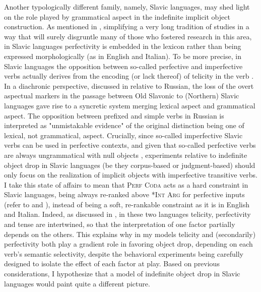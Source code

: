 Another typologically different family, namely, Slavic languages, may shed light on the role played by grammatical aspect in the indefinite implicit object construction. As mentioned in , simplifying a very long tradition of studies in a way that will surely disgruntle many of those who fostered research in this area, in Slavic languages perfectivity is embedded in the lexicon rather than being expressed morphologically (as in English and Italian). To be more precise, in Slavic languages the opposition between so-called perfective and imperfective verbs actually derives from the encoding (or lack thereof) of telicity in the verb \parencite{bertinetto2012diachronic, bertinetto-delfitto2000aspect, bertinetto2001frequent}. In a diachronic perspective, discussed in \textcite{bertinetto2012diachronic} relative to Russian, the loss of the overt aspectual markers in the passage between Old Slavonic to (Northern) Slavic languages gave rise to a syncretic system merging lexical aspect and grammatical aspect. The opposition between prefixed and simple verbs in Russian is interpreted as "unmistakable evidence" of the original distinction being one of lexical, not grammatical, aspect. Crucially, since so-called imperfective Slavic verbs can be used in perfective contexts, and given that so-called perfective verbs are always ungrammatical with null objects \parencite{sopata2016null, TsimpliPapadopoulou2006}, experiments relative to indefinite object drop in Slavic languages (be they corpus-based or judgment-based) should only focus on the realization of implicit objects with imperfective transitive verbs. I take this state of affairs to mean that \textsc{Perf Coda} acts as a hard constraint in Slavic languages, being always re-ranked above \textsc{*Int Arg} for perfective inputs (refer to  and ), instead of being a soft, re-rankable constraint as it is in English and Italian. Indeed, as discussed in , in these two languages telicity, perfectivity and tense are intertwined, so that the interpretation of one factor partially depends on the others. This explains why in my models telicity and (secondarily) perfectivity both play a gradient role in favoring object drop, depending on each verb's semantic selectivity, despite the behavioral experiments being carefully designed to isolate the effect of each factor at play. Based on previous considerations, I hypothesize that a model of indefinite object drop in Slavic languages would paint quite a different picture.

